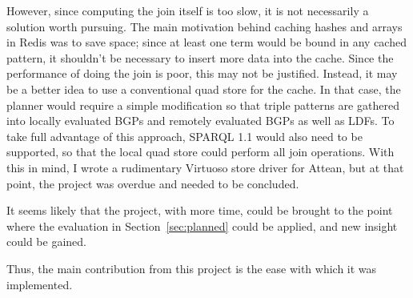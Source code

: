 However, since computing the join itself is too slow, it is not
necessarily a solution worth pursuing. The main motivation behind
caching hashes and arrays in Redis was to save space; since at least
one term would be bound in any cached pattern, it shouldn't be
necessary to insert more data into the cache. Since the performance of
doing the join is poor, this may not be justified. Instead, it may be
a better idea to use a conventional quad store for the cache. In that
case, the planner would require a simple modification so that triple
patterns are gathered into locally evaluated BGPs and remotely
evaluated BGPs as well as LDFs. To take full advantage of this
approach, SPARQL 1.1  would also need to be supported,
so that the local quad store could perform all join operations. With
this in mind, I wrote a rudimentary Virtuoso store driver for Attean, but
at that point, the project was overdue and needed to be concluded. 

It seems likely that the project, with more time, could be brought to
the point where the evaluation in Section~\ref{sec:planned} could be
applied, and new insight could be gained.

Thus, the main contribution from this project is the ease
with which it was implemented.


